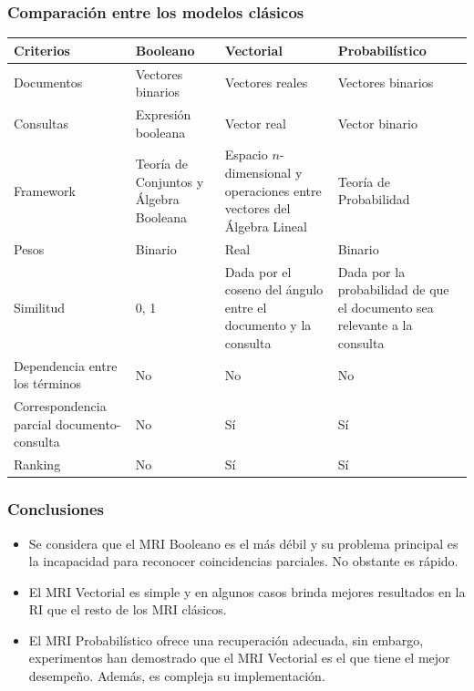\documentclass[
10pt, %
aspectratio=169, %
]{beamer}
\begin{document}
	\begin{frame}
		
		\frametitle{Comparación entre los modelos clásicos}
		
			\begin{table}[h]
			\centering
			\begin{tabular}{|p{3cm}|p{3cm}|p{3.7cm}|p{3.3cm}|}
				\hline
				\textbf{Criterios} & \textbf{Booleano} & \textbf{Vectorial} & \textbf{Probabilístico} \\
				\hline
				\hline
				Documentos& Vectores binarios & Vectores reales & Vectores binarios \\
				\hline
				Consultas & Expresión booleana & Vector real &Vector binario \\
				\hline
				Framework & Teoría de Conjuntos y Álgebra Booleana & Espacio $n$-dimensional y operaciones entre vectores del Álgebra Lineal & Teoría de Probabilidad \\
				\hline
				Pesos & Binario & Real & Binario \\
				\hline
				Similitud & {0, 1} & Dada por el coseno del ángulo entre el documento y la consulta & Dada por la probabilidad de que el documento sea relevante a la consulta \\
				\hline
				Dependencia entre los términos & No & No & No \\
				\hline
				Correspondencia parcial documento-consulta & No & Sí & Sí \\
				\hline
				Ranking & No & Sí & Sí \\
				\hline
			\end{tabular}
		\end{table}
		
	\end{frame}
	
	\begin{frame}
		
		\frametitle{Conclusiones}
		
		\begin{itemize}
			
			\item Se considera que el MRI Booleano es el más débil y su problema principal es la incapacidad para reconocer coincidencias parciales. No obstante es rápido.
			
			\item El MRI Vectorial es simple y en algunos casos brinda mejores resultados en la RI que el resto de los MRI clásicos. \\[2mm]
			
			\item El MRI Probabilístico ofrece una recuperación adecuada, sin embargo, experimentos han demostrado que el MRI Vectorial es el que tiene el mejor desempeño. Además, es compleja su implementación.
			
		\end{itemize}
		
	\end{frame}
	
\end{document}

